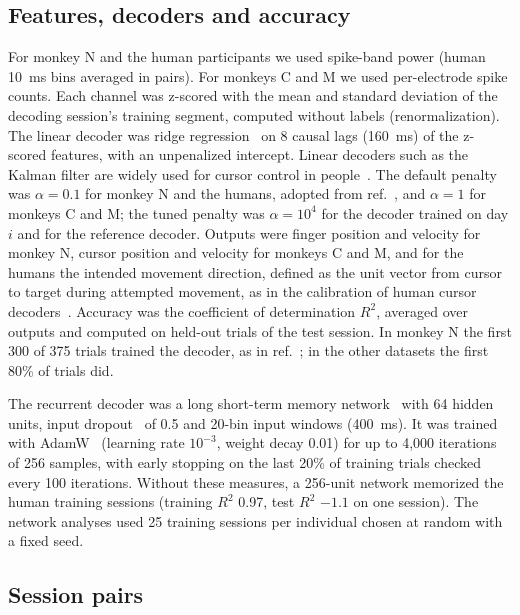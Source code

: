 \documentclass{iopjournal}
\begin{document}
\subsection{Features, decoders and accuracy}

For monkey N and the human participants we used spike-band power (human 10~ms bins averaged in pairs). For monkeys C and
M we used per-electrode spike counts. Each channel was z-scored with the mean and standard deviation of the decoding
session's training segment, computed without labels (renormalization). The linear decoder was ridge
regression~\cite{hoerl1970} on 8 causal lags (160~ms) of the z-scored features, with an unpenalized intercept. Linear
decoders such as the Kalman filter are widely used for cursor control in people~\cite{kim2008,malik2011}. The default
penalty was $\alpha = 0.1$ for monkey N and the humans, adopted from ref.~\cite{temmar2025}, and $\alpha = 1$ for monkeys C
and M; the tuned penalty was $\alpha = 10^4$ for the decoder trained on day $i$ and for the reference decoder. Outputs were
finger position and velocity for monkey N, cursor position and velocity for monkeys C and M, and for the humans the
intended movement direction, defined as the unit vector from cursor to target during attempted movement, as in the
calibration of human cursor decoders~\cite{kim2008,jarosiewicz2013}. Accuracy was
the coefficient of determination $R^2$, averaged over outputs and computed on held-out trials of the test session. In
monkey N the first 300 of 375 trials trained the decoder, as in ref.~\cite{temmar2025}; in the other datasets the first
80\% of trials did.

The recurrent decoder was a long short-term memory network~\cite{hochreiter1997} with 64 hidden units, input
dropout~\cite{srivastava2014} of 0.5 and 20-bin input windows (400~ms). It was trained with AdamW~\cite{loshchilov2019}
(learning rate $10^{-3}$, weight decay 0.01) for up to 4,000 iterations of 256 samples, with early stopping on the last
20\% of training trials checked every 100 iterations. Without these measures, a 256-unit network memorized the human
training sessions (training $R^2$ 0.97, test $R^2$ $-1.1$ on one session). The network analyses used 25 training
sessions per individual chosen at random with a fixed seed.

\subsection{Session pairs}
\end{document}
